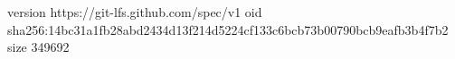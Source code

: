 version https://git-lfs.github.com/spec/v1
oid sha256:14bc31a1fb28abd2434d13f214d5224cf133c6bcb73b00790bcb9eafb3b4f7b2
size 349692

